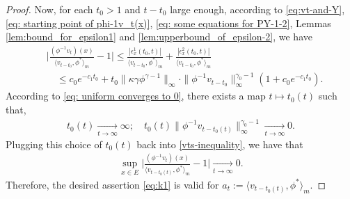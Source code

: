 \documentclass[12pt,a4paper]{amsart}
\theoremstyle{definition}
\numberwithin{equation}{section}
\begin{document}
\begin{proof}
  Now, for each $t_0 > 1$ and $t-t_0$ large enough, according to \eqref{eq:vt-and-Y},  \eqref{eq: starting point of phi-1v_t(x)}, \eqref{eq: some equations for PY-1-2}, Lemmas \ref{lem:bound_for_epsilon1} and \ref{lem:upperbound_of_epsilon-2}, we have
  \begin{align} 
    \label{vts-inequality}
    &\Big|\frac{(\phi^{-1}v_t)(x)}{\langle v_{t-t_0},\phi^* \rangle_m}-1 \Big|
      \leq \frac{|\epsilon_x^1(t_0,t)|}{\langle v_{t-t_0},\phi^* \rangle_m} + \frac{|\epsilon_x^2(t_0,t)|}{\langle v_{t-t_0},\phi^* \rangle_m}\\
    & \quad \leq c_0e^{-c_1 t_0} +t_0\|\kappa\gamma\phi^{\gamma - 1}\|_{\infty}
      \cdot \|\phi^{-1}v_{t-t_0}\|^{\gamma_0-1}_\infty (1+c_0 e^{-c_1 t_0}).
  \end{align}
  According to \eqref{eq: uniform converges to 0}, there exists a map $t\mapsto t_0(t)$ such that,
  \begin{align}
    t_0(t)
    \xrightarrow[t\to\infty]{} \infty;
    \quad t_0(t)\| \phi^{-1}v_{t-t_0(t)}\|^{\gamma_0 - 1}_\infty
    \xrightarrow[t\to\infty]{} 0.
  \end{align}
  Plugging this choice of $t_0(t)$ back into \eqref{vts-inequality}, we have that
  \begin{align}\label{eq:k1}
    \sup_{x\in E}\Big|\frac{(\phi^{-1}v_t)(x)}{\langle v_{t-t_0(t)},\phi^* \rangle_m}-1 \Big|
    \xrightarrow[t\to\infty]{} 0.
  \end{align}
  Therefore, the desired assertion \eqref{eq:k1} is valid for $a_t := \langle v_{t-t_0(t)},\phi^* \rangle_m$.
\end{proof}
\end{document}

